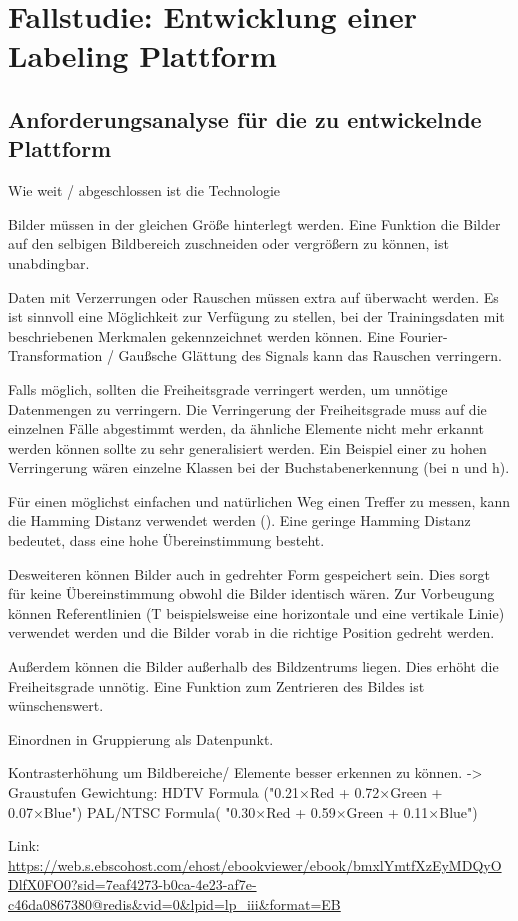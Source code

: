 \chapter{Fallstudie: Entwicklung einer Labeling Plattform}\label{sec:anforderungsanalyse}
\section{Anforderungsanalyse für die zu entwickelnde Plattform}

Wie weit / abgeschlossen ist die Technologie

Bilder müssen in der gleichen Größe hinterlegt werden. Eine Funktion die Bilder auf den selbigen Bildbereich zuschneiden oder vergrößern zu können, ist unabdingbar.

Daten mit Verzerrungen oder Rauschen müssen extra auf überwacht werden. Es ist sinnvoll eine Möglichkeit zur Verfügung zu stellen, bei der Trainingsdaten mit beschriebenen Merkmalen gekennzeichnet werden können. Eine Fourier-Transformation / Gaußsche Glättung des Signals kann das Rauschen verringern.

Falls möglich, sollten die Freiheitsgrade verringert werden, um unnötige Datenmengen zu verringern. Die Verringerung der Freiheitsgrade muss auf die einzelnen Fälle abgestimmt werden, da ähnliche Elemente nicht mehr erkannt werden können sollte zu sehr generalisiert werden. Ein Beispiel einer zu hohen Verringerung wären einzelne Klassen bei der Buchstabenerkennung (bei n und h).

Für einen möglichst einfachen und natürlichen Weg einen Treffer zu messen, kann die Hamming Distanz verwendet werden (\cite[][]{cv-principles-link}). Eine geringe Hamming Distanz bedeutet, dass eine hohe Übereinstimmung besteht.

Desweiteren können Bilder auch in gedrehter Form gespeichert sein. Dies sorgt für keine Übereinstimmung obwohl die Bilder identisch wären. Zur Vorbeugung können Referentlinien (T beispielsweise eine horizontale und eine vertikale Linie) verwendet werden und die Bilder vorab in die richtige Position gedreht werden.

Außerdem können die Bilder außerhalb des Bildzentrums liegen. Dies erhöht die Freiheitsgrade unnötig. Eine Funktion zum Zentrieren des Bildes ist wünschenswert. 

Einordnen in Gruppierung als Datenpunkt.


Kontrasterhöhung um Bildbereiche/ Elemente besser erkennen zu können.
-> Graustufen Gewichtung:
HDTV Formula ("0.21×Red + 0.72×Green + 0.07×Blue")
PAL/NTSC Formula( "0.30×Red + 0.59×Green + 0.11×Blue")

Link: \url{https://web.s.ebscohost.com/ehost/ebookviewer/ebook/bmxlYmtfXzEyMDQyODlfX0FO0?sid=7eaf4273-b0ca-4e23-af7e-c46da0867380@redis&vid=0&lpid=lp_iii&format=EB}

